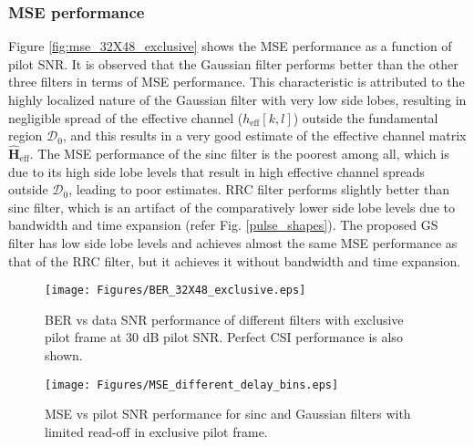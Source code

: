 \vspace{1mm}
\subsubsection{MSE performance}
Figure \ref{fig:mse_32X48_exclusive} shows the MSE performance as a function of pilot SNR. It is observed that the Gaussian filter performs better than the other three filters in terms of MSE performance. This characteristic is attributed to the highly localized nature  of the Gaussian filter with very low side lobes, resulting in negligible spread of the effective channel \big($h_{\mathrm{eff}}[k,l]$\big) outside the fundamental region $\mathcal{D}_{0}$, and this results in a very good estimate of the effective channel matrix $\hat{\textbf{H}}_{\mathrm{eff}}$. The MSE performance of the sinc filter is the poorest among all, which is due to its high side lobe levels that result in high effective channel spreads outside $\mathcal{D}_{0}$, leading to poor estimates. RRC filter performs slightly better than sinc filter, which is an artifact of the comparatively lower side lobe levels due to bandwidth and time expansion (refer Fig. \ref{pulse_shapes}). The proposed GS filter has low side lobe levels and achieves almost the same MSE performance as that of the RRC filter, but it achieves it without bandwidth and time expansion. 

\begin{figure}[!t]
\centering
\texttt{[image: Figures/BER\_32X48\_exclusive.eps]}
\caption{BER vs data SNR performance of different filters with exclusive pilot frame at 30 dB pilot SNR. Perfect CSI performance is also shown.}
\label{fig:BER_32X48_exclusive}
\vspace{-4mm}
\end{figure}

\begin{figure}[!t]
\centering
\texttt{[image: Figures/MSE\_different\_delay\_bins.eps]}
\caption{MSE vs pilot SNR performance for sinc and Gaussian filters with limited read-off  in exclusive pilot frame.}
\label{fig:MSE_vs_SNR_different_delay_bins}
\vspace{-4mm}
\end{figure}

\vspace{1mm}
